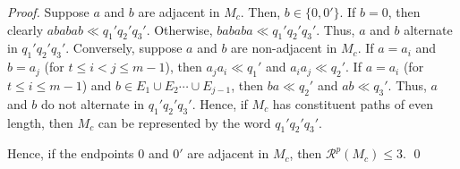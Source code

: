 \documentclass[10pt,a4paper]{amsart}
\begin{document}
\begin{proof}
	Suppose $a$ and $b$ are adjacent in $M_c$. Then, $b \in \{0,0'\}$. If $b = 0$, then clearly $ababab \ll q_1'q_2'q_3'$. Otherwise, $bababa \ll q_1'q_2'q_3'$. Thus, $a$ and $b$ alternate in $q_1'q_2'q_3'$. Conversely, suppose $a$ and $b$ are non-adjacent in $M_c$. If $a = a_i$ and $b = a_j$ (for $t \le i < j \le m-1$), then $a_j a_i \ll q_1'$ and $a_ia_j \ll q_2'$. If $a = a_i$ (for $t \le i \le m-1$) and $b \in E_1 \cup E_2 \cdots \cup  E_{j-1}$, then $ba\ll q_2'$ and $ab \ll q_3'$. Thus, $a$ and $b$ do not alternate in $q_1'q_2'q_3'$.  
	Hence, if $M_c$ has constituent paths of even length, then $M_c$ can be represented by the word $q_1'q_2'q_3'$.
	
	Hence, if the endpoints $0$ and $0'$ are adjacent in $M_c$, then $\mathcal{R}^p(M_c) \le 3$.	\qed
\end{proof}
\end{document}

